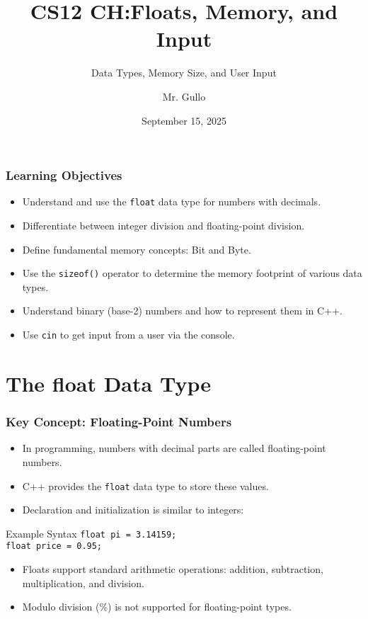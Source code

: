 \documentclass{beamer}
\title[Floats and Memory]{CS12 CH:Floats, Memory, and Input}
\subtitle{Data Types, Memory Size, and User Input}
\author[Mr. Gullo]{Mr. Gullo}
\date[Sep 15, 2025]{September 15, 2025}
\begin{document}
\frame{\titlepage}

\begin{frame}
\frametitle{Learning Objectives}
\begin{itemize}
    \item Understand and use the \texttt{float} data type for numbers with decimals.
    \item Differentiate between integer division and floating-point division.
    \item Define fundamental memory concepts: Bit and Byte.
    \item Use the \texttt{sizeof()} operator to determine the memory footprint of various data types.
    \item Understand binary (base-2) numbers and how to represent them in C++.
    \item Use \texttt{cin} to get input from a user via the console.
\end{itemize}
\end{frame}

\section{The float Data Type}

\begin{frame}
\frametitle{Key Concept: Floating-Point Numbers}
\begin{itemize}
    \item In programming, numbers with decimal parts are called \alert{floating-point numbers}.
    \item C++ provides the \texttt{float} data type to store these values.
    \item Declaration and initialization is similar to integers:
\end{itemize}
\begin{block}{Example Syntax}
\texttt{float pi = 3.14159;} \\
\texttt{float price = 0.95;}
\end{block}
\begin{itemize}
    \item Floats support standard arithmetic operations: addition, subtraction, multiplication, and division.
    \item \alert{Modulo division (\%)} is not supported for floating-point types.
\end{itemize}
\end{frame}
\end{document}
